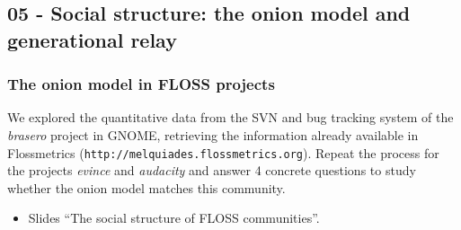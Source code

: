 \documentclass[a4paper]{article}
\begin{document}
\subsection{05 - Social structure: the onion model and generational relay}

\subsubsection{The onion model in FLOSS projects}
\label{sub:empirical-onion}
 
We explored the quantitative data from the SVN and bug tracking system of the 
\textit{brasero} project in GNOME, retrieving the information
already available in Flossmetrics (\texttt{http://melquiades.flossmetrics.org}). 
Repeat the process for the projects \textit{evince} and \textit{audacity} and
answer 4 concrete questions to study whether the onion model matches this 
community.

\begin{itemize}
\item Slides ``The social structure of FLOSS communities''.
\end{itemize}
\end{document}
